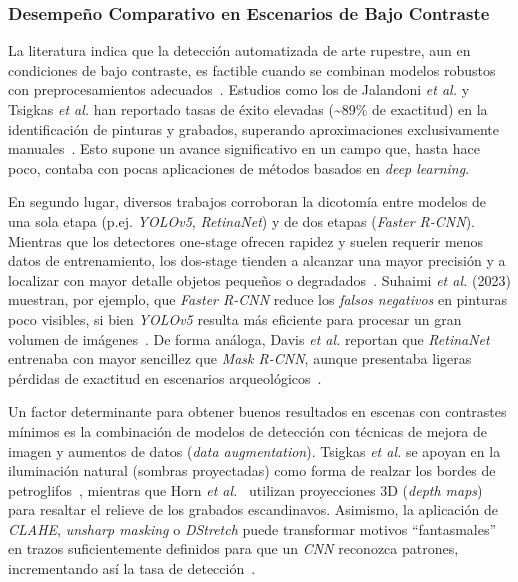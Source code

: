 \subsubsection{Desempeño Comparativo en Escenarios de Bajo Contraste}

La literatura indica que la detección automatizada de arte rupestre, aun en condiciones de bajo contraste, es factible cuando se combinan modelos robustos con preprocesamientos adecuados~\cite{fattal2007}. Estudios como los de Jalandoni \textit{et al.} y Tsigkas \textit{et al.} han reportado tasas de éxito elevadas (\textasciitilde 89\% de exactitud) en la identificación de pinturas y grabados, superando aproximaciones exclusivamente manuales~\cite{jalandoni2022,tsigkas2020}. Esto supone un avance significativo en un campo que, hasta hace poco, contaba con pocas aplicaciones de métodos basados en \textit{deep learning}.

En segundo lugar, diversos trabajos corroboran la dicotomía entre modelos de una sola etapa (p.ej. \textit{YOLOv5}, \textit{RetinaNet}) y de dos etapas (\textit{Faster R-CNN}). Mientras que los detectores one-stage ofrecen rapidez y suelen requerir menos datos de entrenamiento, los dos-stage tienden a alcanzar una mayor precisión y a localizar con mayor detalle objetos pequeños o degradados~\cite{davis2021,suhaimi2023}. Suhaimi \textit{et al.} (2023) muestran, por ejemplo, que \textit{Faster R-CNN} reduce los \emph{falsos negativos} en pinturas poco visibles, si bien \textit{YOLOv5} resulta más eficiente para procesar un gran volumen de imágenes~\cite{suhaimi2023}. De forma análoga, Davis \textit{et al.} reportan que \textit{RetinaNet} entrenaba con mayor sencillez que \textit{Mask R-CNN}, aunque presentaba ligeras pérdidas de exactitud en escenarios arqueológicos~\cite{davis2021}.

Un factor determinante para obtener buenos resultados en escenas con contrastes mínimos es la combinación de modelos de detección con técnicas de mejora de imagen y aumentos de datos (\textit{data augmentation}). Tsigkas \textit{et al.} se apoyan en la iluminación natural (sombras proyectadas) como forma de realzar los bordes de petroglifos~\cite{tsigkas2020}, mientras que Horn \textit{et al.}~\cite{horn2022} utilizan proyecciones 3D (\textit{depth maps}) para resaltar el relieve de los grabados escandinavos. Asimismo, la aplicación de \textit{CLAHE}, \textit{unsharp masking} o \textit{DStretch} puede transformar motivos “fantasmales” en trazos suficientemente definidos para que un \textit{CNN} reconozca patrones, incrementando así la tasa de detección~\cite{suhaimi2023,davis2021}.

